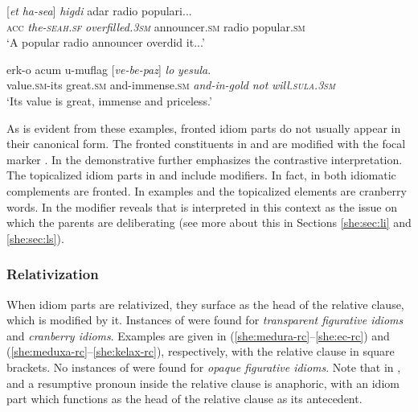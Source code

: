 \documentclass[output=paper]{langsci/langscibook}
\begin{document}
	\ea\label{she:sea-top}
    	\gll \textnormal{[}\textit{{\alef}et} \textit{ha-se{\alef}a}\textnormal{]} \textit{higdi{\shin}} {\shin}adar radio populari...\\
    	   \textsc{acc} \textit{the-\textsc{seah}.\textsc{sf}} \textit{overfilled.\textsc{3sm}} announcer.\textsc{sm} radio popular.\textsc{sm}\\
    	\glt `A popular radio announcer overdid it...'
	\z

	\ea\label{she:yesula-top}
    	\gll {\ayin}erk-o {\ayin}acum u-muflag \textnormal{[}\textit{ve-be-paz}\textnormal{]} \textit{lo} \textit{yesula}.\\
    	   value.\textsc{sm}-its great.\textsc{sm} and-immense.\textsc{sm} \textit{and-in-gold} \textit{not} \textit{will.\textsc{sula}.\textsc{3sm}}\\
    	\glt `Its value is great, immense and priceless.'
	\z

As is evident from these examples, fronted idiom parts do not usually appear in their canonical form. The fronted constituents in  and  are modified with the focal marker . In  the demonstrative  further emphasizes the contrastive interpretation. The topicalized idiom parts in  and  include modifiers. In fact, in  both idiomatic complements are fronted. In examples  and  the topicalized elements are cranberry words. In  the modifier  reveals that  is interpreted in this context as the issue on which the parents are deliberating (see more about this in Sections \ref{she:sec:li} and \ref{she:sec:ls}).

\subsubsection{Relativization}
\label{she:sec:relativization}
When idiom parts are relativized, they surface as the head of the relative clause, which is modified by it. Instances of  were found for \textit{transparent figurative idioms} and \textit{cranberry idioms}. Examples are given in (\ref{she:medura-rc}--\ref{she:ec-rc}) and (\ref{she:meduxa-rc}--\ref{she:kelax-rc}), respectively, with the relative clause in square brackets. No instances of  were found for \textit{opaque figurative idioms}.
Note that in ,  and  a resumptive pronoun inside the relative clause is anaphoric, with an idiom part which functions as the head of the relative clause as its antecedent.
\end{document}
